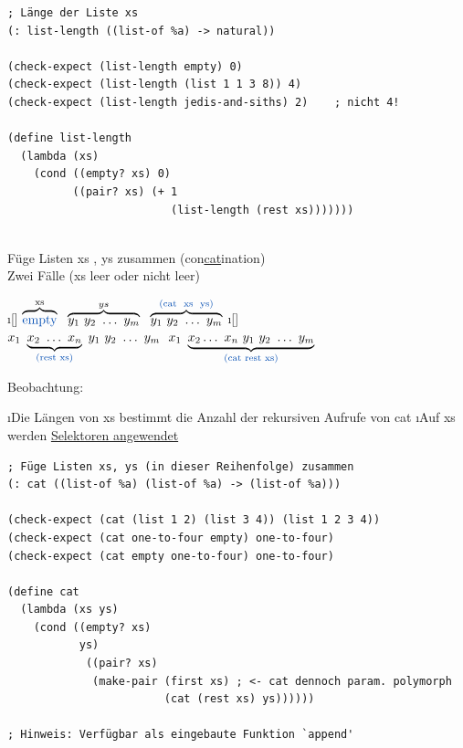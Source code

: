 \begin{lstlisting}[frame=single]
; Länge der Liste xs
(: list-length ((list-of %a) -> natural))

(check-expect (list-length empty) 0)
(check-expect (list-length (list 1 1 3 8)) 4)
(check-expect (list-length jedis-and-siths) 2)    ; nicht 4!

(define list-length
  (lambda (xs)
    (cond ((empty? xs) 0)
          ((pair? xs) (+ 1 
                         (list-length (rest xs)))))))
  
\end{lstlisting}
Füge Listen xs , ys zusammen (con\uline{cat}ination)\\
Zwei Fälle (xs leer oder nicht leer)
\begin{enumerate}
\i[] $\overbrace{ \text{\code{empty}}}^{\text{xs}} \ \ \overbrace{y_1 \ y_2 \ \ldots \ y_m}^{ys}
 \ \ \overbrace{y_1 \ y_2 \ \ldots \ y_m}^{\text{\code{(cat \ xs \ ys)}}}$
\i[] $x_1 \ \underbrace{x_2 \ \ldots \ x_n}_{\text{\code{(rest xs)}}} \ y_1 \ y_2 \ \ldots \ y_m \ \ x_1 \ \underbrace{ x_2 \ldots \ x_n \ y_1 \ y_2 \ \ldots \ y_m}_{\text{\code{(cat rest xs)}}}$
\end{enumerate}

Beobachtung:
\begin{enumerate}[-]
\i Die Längen von xs bestimmt die Anzahl der rekursiven Aufrufe von cat
\i Auf xs werden \uline{Selektoren angewendet}
\end{enumerate}
\begin{lstlisting}[frame=single]
; Füge Listen xs, ys (in dieser Reihenfolge) zusammen
(: cat ((list-of %a) (list-of %a) -> (list-of %a)))

(check-expect (cat (list 1 2) (list 3 4)) (list 1 2 3 4))
(check-expect (cat one-to-four empty) one-to-four)
(check-expect (cat empty one-to-four) one-to-four)

(define cat
  (lambda (xs ys)
    (cond ((empty? xs) 
           ys)
            ((pair? xs)
             (make-pair (first xs) ; <- cat dennoch param. polymorph
                        (cat (rest xs) ys))))))

; Hinweis: Verfügbar als eingebaute Funktion `append'
\end{lstlisting}